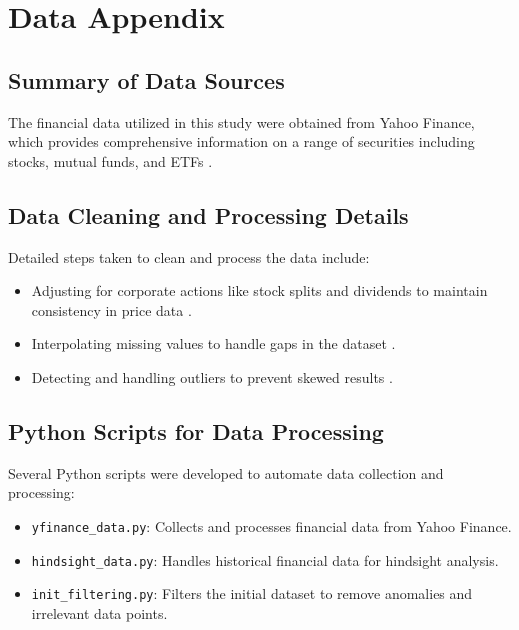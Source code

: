 \appendix
\section{Data Appendix}

\subsection{Summary of Data Sources}
The financial data utilized in this study were obtained from Yahoo Finance, which provides comprehensive information on a range of securities including stocks, mutual funds, and ETFs \citep{yfinance}.

\subsection{Data Cleaning and Processing Details}
Detailed steps taken to clean and process the data include:
\begin{itemize}
    \item Adjusting for corporate actions like stock splits and dividends to maintain consistency in price data \citep{boyle1977options}.
    \item Interpolating missing values to handle gaps in the dataset \citep{glasserman2004monte}.
    \item Detecting and handling outliers to prevent skewed results \citep{kuhle2021economic}.
\end{itemize}

\subsection{Python Scripts for Data Processing}
Several Python scripts were developed to automate data collection and processing:
\begin{itemize}
    \item \texttt{yfinance\_data.py}: Collects and processes financial data from Yahoo Finance.
    \item \texttt{hindsight\_data.py}: Handles historical financial data for hindsight analysis.
    \item \texttt{init\_filtering.py}: Filters the initial dataset to remove anomalies and irrelevant data points.
\end{itemize}

